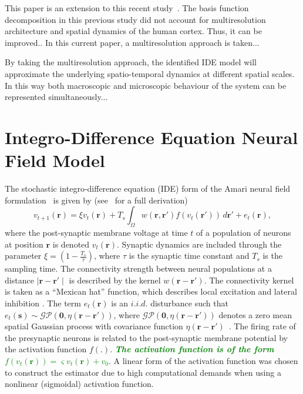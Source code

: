 \documentclass[journal,a4paper]{IEEEtran}
\newcommand{\dean}[1]{\textsf{\emph{\textbf{\textcolor{green}{#1}}}}}
\begin{document}
This paper is an extension to this recent study~\cite{Freestone2011}. The basis function decomposition in this previous study did not account for multiresolution architecture and spatial dynamics of the human cortex. Thus, it can be improved.. In this current paper, a multiresolution approach is taken...

By taking the multiresolution approach, the identified IDE model will approximate the underlying spatio-temporal dynamics at different spatial scales. In this way both macroscopic and microscopic behaviour of the system can be represented simultaneously...

\section{Integro-Difference Equation Neural Field Model}
The stochastic integro-difference equation (IDE) form of the Amari neural field  formulation~\cite{Amari1977} is given by (see~\cite{Freestone2011} for a full derivation)
\begin{equation}\label{eq:DiscreteTimeModel}
	v_{t+1}\left(\mathbf{r}\right) = 
	\xi v_t\left(\mathbf{r}\right) + 
	T_s \int_\Omega { 
	    w\left(\mathbf{r},\mathbf{r'}\right)
	    f\left(v_t\left(\mathbf{r}'\right)\right) 
	\, d\mathbf{r}'} 
	+ e_t\left(\mathbf{r}\right), 
\end{equation}
where the post-synaptic membrane voltage at time $t$ of a population of neurons at position $\mathbf r$ is denoted $v_t\left(\mathbf r\right)$. Synaptic dynamics are included through the parameter $\xi=\left(1-\frac{ T_s}{\tau}\right)$, where $\tau$ is the synaptic time constant and $T_s$ is the sampling time. The connectivity strength between neural populations at a distance $\mid\mathbf{r}-\mathbf{r'}\mid$ is described by the kernel $w\left(\mathbf{r}-\mathbf{r}'\right)$. The connectivity kernel is taken as a ``Mexican hat'' function, which describes local excitation and lateral inhibition \cite{Amari1977}. The term $e_t(\mathbf r)$ is an $i.i.d.$ disturbance such that $e_t(\mathbf{s})\sim\mathcal{GP}(\mathbf 0,\eta(\mathbf{r}-\mathbf{r'}))$, where $\mathcal{GP}(\mathbf 0,\eta(\mathbf{r}-\mathbf{r'}))$  denotes a zero mean spatial Gaussian process with covariance function $\eta(\mathbf{r}-\mathbf{r'})$~\cite{Rasmussen2005}. The firing rate of the presynaptic neurons is related to the post-synaptic membrane potential by the activation function $f\left(.\right)$. \dean{The activation function is of the form $f(v_t(\mathbf{r})) = \varsigma v_t(\mathbf{r}) + v_0$}. A linear form of the activation function was chosen to construct the estimator due to high computational demands when using a nonlinear (sigmoidal) activation function.
\end{document}
